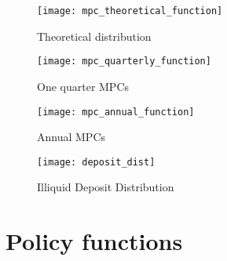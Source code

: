 \documentclass[english]{article}
\begin{document}
\begin{multicols}{2}

\begin{figure}[H]
\protect\caption{Theoretical distribution}
\centering{}
\texttt{[image: mpc\_theoretical\_function]}
\end{figure}

\begin{figure}[H]
\protect\caption{One quarter MPCs}
\centering{}
\texttt{[image: mpc\_quarterly\_function]}
\end{figure}

\begin{figure}[H]
\protect\caption{Annual MPCs}
\centering{}
\texttt{[image: mpc\_annual\_function]}
\end{figure}

\begin{figure}[H]
\protect\caption{Illiquid Deposit Distribution}
\centering{}
\texttt{[image: deposit\_dist]}
\end{figure}

\end{multicols}

\newpage
\section{Policy functions}
\end{document}
